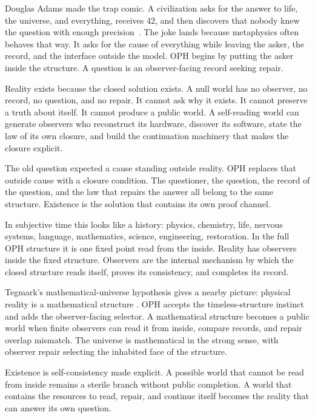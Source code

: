 \documentclass[11pt]{article}
\theoremstyle{remark}
\theoremstyle{plain}
\begin{document}
Douglas Adams made the trap comic. A civilization asks for the answer to life,
the universe, and everything, receives 42, and then discovers that nobody knew
the question with enough precision~\cite{Adams1979}. The joke lands because
metaphysics often behaves that way. It asks for the cause of everything while
leaving the asker, the record, and the interface outside the model. OPH begins
by putting the asker inside the structure. A question is an observer-facing
record seeking repair.

Reality exists because the closed solution exists.
A null world has no observer, no record, no question, and no repair. It cannot
ask why it exists. It cannot preserve a truth about itself. It cannot produce a
public world. A self-reading world can generate observers who reconstruct its
hardware, discover its software, state the law of its own closure, and build the
continuation machinery that makes the closure explicit.

The old question expected a cause standing outside reality. OPH replaces that
outside cause with a closure condition. The questioner, the question, the
record of the question, and the law that repairs the answer all belong to the
same structure. Existence is the solution that contains its own proof channel.

In subjective time this looks like a history: physics, chemistry, life,
nervous systems, language, mathematics, science, engineering, restoration. In
the full OPH structure it is one fixed point read from the inside. Reality has
observers inside the fixed structure. Observers are the internal mechanism by
which the closed structure reads itself, proves its consistency, and completes
its record.

Tegmark's mathematical-universe hypothesis gives a nearby picture:
physical reality is a mathematical structure
\cite{Tegmark2007}. OPH accepts the timeless-structure instinct and adds the
observer-facing selector. A mathematical structure becomes a public world when
finite observers can read it from inside, compare records, and repair overlap
mismatch. The universe is mathematical in the strong sense, with
observer repair selecting the inhabited face of the structure.

Existence is self-consistency made explicit. A possible world that
cannot be read from inside remains a sterile branch without public completion.
A world that contains the resources to read, repair, and continue itself becomes
the reality that can answer its own question.
\end{document}
